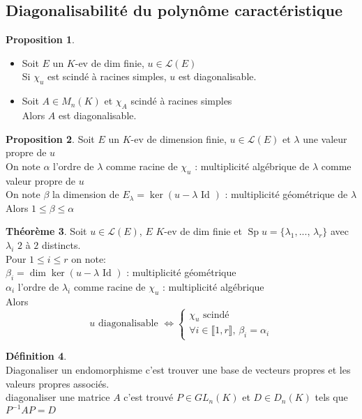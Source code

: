 \documentclass[10pt,a4paper]{article}
\theoremstyle{definition}
\newtheorem{proposition}{Proposition}[section]
\newtheorem{theorem}[proposition]{Théorème}
\newtheorem{definition}[proposition]{Définition}
\DeclareMathOperator{\Sp}{Sp}
\begin{document}
\subsection{Diagonalisabilité du polynôme caractéristique}
\begin{proposition}
\hfill \begin{itemize}
\item Soit $E$ un $K$-ev de dim finie, $u \in \mathcal{L}(E)$ \\
Si $\chi_u$ est scindé à racines simples, $u$ est diagonalisable.
\item Soit $A \in M_n(K)$ et $\chi_A$ scindé à racines simples \\
Alors $A$ est diagonalisable.
\end{itemize}
\end{proposition}
\begin{proposition}
Soit $E$ un $K$-ev de dimension finie, $u \in \mathcal{L}(E)$ et $\lambda$ une valeur propre de $u$ \\
On note $\alpha$ l'ordre de $\lambda$ comme racine de $\chi_u$ : multiplicité algébrique de $\lambda$ comme valeur propre de $u$ \\
On note $\beta$ la dimension de $E_\lambda = \ker \left( u - \lambda \text{ Id } \right)$ : multiplicité géométrique de $\lambda$ \\
Alors $\boxed{1 \leq \beta \leq \alpha}$
\end{proposition}
\begin{theorem}
Soit $u \in \mathcal{L}(E)$, $E$ $K$-ev de dim finie et $\Sp u = \{ \lambda_1, ...,\, \lambda_r \}$ avec $\lambda_i$ $2$ à $2$ distincts. \\
Pour $1 \leq i \leq r$ on note: \\
$\beta_i = \dim \ker \left( u - \lambda \text{ Id } \right)$ : multiplicité géométrique\\
$\alpha_i$ l'ordre de $\lambda_i$ comme racine de $\chi_u$ : multiplicité algébrique\\
Alors 
\[ \boxed{u \text{ diagonalisable } \iff \begin{cases}
\chi_u \text{ scindé } \\
\forall i \in \llbracket 1, r \rrbracket,\, \beta_i = \alpha_i
\end{cases}} \]
\end{theorem}
\begin{definition}
\hfill \\
Diagonaliser un endomorphisme c'est trouver une base de vecteurs propres et les valeurs propres associés. \\
diagonaliser une matrice $A$ c'est trouvé $P \in GL_n(K)$ et $D \in D_n(K)$ tels que $P^{-1}AP = D$
\end{definition}
\end{document}
